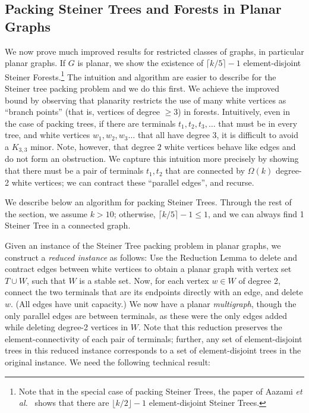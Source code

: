 \documentclass[11pt]{article}
\newcommand{\etal}{{\em et al.}\ }
\def\floor#1{\lfloor {#1} \rfloor}
\def\ceil#1{\lceil {#1} \rceil}
\begin{document}
\subsection{Packing Steiner Trees and Forests in Planar Graphs}
\label{subsec:planarPacking}

We now prove much improved results for restricted classes of graphs,
in particular planar graphs. If $G$ is planar, we show the existence
of $\ceil{k/5} - 1$ element-disjoint Steiner Forests.\footnote{Note
  that in the special case of packing Steiner Trees, the paper of
  Aazami \etal \cite{ACJ08} shows that there are $\floor{k/2} - 1$
  element-disjoint Steiner Trees.} The intuition and algorithm are
easier to describe for the Steiner tree packing problem and we do this
first. We achieve the improved bound by observing that planarity
restricts the use of many white vertices as ``branch points'' (that
is, vertices of degree $\ge 3$) in forests. Intuitively, even in the
case of packing trees, if there are terminals $t_1, t_2, t_3, \ldots $
that must be in every tree, and white vertices $w_1, w_2, w_3 \ldots$
that all have degree 3, it is difficult to avoid a $K_{3,3}$
minor. Note, however, that degree $2$ white vertices behave like edges
and do not form an obstruction.  We capture this intuition more
precisely by showing that there must be a pair of terminals $t_1,t_2$
that are connected by $\Omega(k)$ degree-2 white vertices; we can
contract these ``parallel edges'', and recurse.

We describe below an algorithm for packing Steiner Trees.  Through the
rest of the section, we assume $k > 10$; otherwise, $\ceil{k/5} - 1
\le 1$, and we can always find 1 Steiner Tree in a connected graph.

Given an instance of the Steiner Tree packing problem in planar
graphs, we construct a \emph{reduced instance} as follows: Use the
Reduction Lemma to delete and contract edges between white vertices to
obtain a planar graph with vertex set $T \cup W$, such that $W$ is a
stable set. Now, for each vertex $w \in W$ of degree 2, connect the
two terminals that are its endpoints directly with an edge, and delete
$w$. (All edges have unit capacity.)  We now have a planar
\emph{multigraph}, though the only parallel edges are between
terminals, as these were the only edges added while deleting degree-2
vertices in $W$. Note that this reduction preserves the
element-connectivity of each pair of terminals; further, any set of
element-disjoint trees in this reduced instance corresponds to a set
of element-disjoint trees in the original instance. We need the
following technical result:
\end{document}

